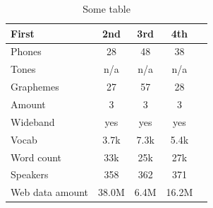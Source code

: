 \documentclass{article}
\begin{document}
\begin{table}
\centering
\begin{tabular}{|l|c|c|c|c|} %
 \hline %
First & 2nd & 3rd & 4th \\ %
 \hline
 Phones & 28 & 48 & 38 \\
 Tones & n/a & n/a & n/a \\
 Graphemes & 27 & 57 & 28 \\
 Amount & 3 & 3 & 3 \\
 Wideband & yes & yes & yes \\
 Vocab & 3.7k & 7.3k & 5.4k \\
 Word count & 33k & 25k & 27k \\
 Speakers & 358 & 362 & 371 \\
 Web data amount & 38.0M & 6.4M & 16.2M \\
 \hline
\end{tabular}
\caption{Some table}
\label{tab:table}
\end{table}



\end{document}
